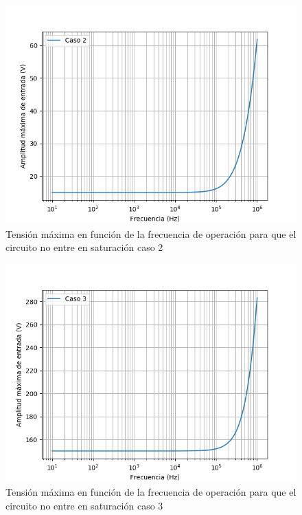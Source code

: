 \begin{figure}[H]
\begin{centering}
\includegraphics[scale=0.5]{../Ex1/iA/Resources1a/sat2}
\par\end{centering}
\caption{Tensión máxima en función de la frecuencia de operación para que el
circuito no entre en saturación caso 2}

\end{figure}

\begin{figure}[H]
\begin{centering}
\includegraphics[scale=0.5]{../Ex1/iA/Resources1a/sat3}
\par\end{centering}
\caption{Tensión máxima en función de la frecuencia de operación para que el
circuito no entre en saturación caso 3}

\end{figure}

